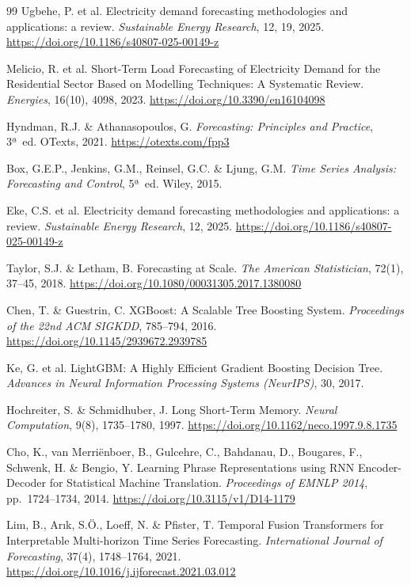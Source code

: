 \documentclass[12pt, a4paper]{article}
\begin{document}
\begin{thebibliography}{99}
Ugbehe, P. et al. Electricity demand forecasting methodologies and applications: a review. \textit{Sustainable Energy Research}, 12, 19, 2025.
\url{https://doi.org/10.1186/s40807-025-00149-z}

Melicio, R. et al. Short-Term Load Forecasting of Electricity Demand for the Residential Sector Based on Modelling Techniques: A Systematic Review. \textit{Energies}, 16(10), 4098, 2023.
\url{https://doi.org/10.3390/en16104098}

Hyndman, R.J. \& Athanasopoulos, G. \textit{Forecasting: Principles and Practice}, 3ª~ed. OTexts, 2021.
\url{https://otexts.com/fpp3}

Box, G.E.P., Jenkins, G.M., Reinsel, G.C. \& Ljung, G.M. \textit{Time Series Analysis: Forecasting and Control}, 5ª~ed. Wiley, 2015.

Eke, C.S. et al. Electricity demand forecasting methodologies and applications: a review. \textit{Sustainable Energy Research}, 12, 2025.
\url{https://doi.org/10.1186/s40807-025-00149-z}

Taylor, S.J. \& Letham, B. Forecasting at Scale. \textit{The American Statistician}, 72(1), 37--45, 2018.
\url{https://doi.org/10.1080/00031305.2017.1380080}

Chen, T. \& Guestrin, C. XGBoost: A Scalable Tree Boosting System. \textit{Proceedings of the 22nd ACM SIGKDD}, 785--794, 2016.
\url{https://doi.org/10.1145/2939672.2939785}

Ke, G. et al. LightGBM: A Highly Efficient Gradient Boosting Decision Tree. \textit{Advances in Neural Information Processing Systems (NeurIPS)}, 30, 2017.

Hochreiter, S. \& Schmidhuber, J. Long Short-Term Memory. \textit{Neural Computation}, 9(8), 1735--1780, 1997.
\url{https://doi.org/10.1162/neco.1997.9.8.1735}

Cho, K., van Merriënboer, B., Gulcehre, C., Bahdanau, D., Bougares, F., Schwenk, H. \& Bengio, Y. Learning Phrase Representations using RNN Encoder-Decoder for Statistical Machine Translation. \textit{Proceedings of EMNLP 2014}, pp.~1724--1734, 2014.
\url{https://doi.org/10.3115/v1/D14-1179}

Lim, B., Arık, S.Ö., Loeff, N. \& Pfister, T. Temporal Fusion Transformers for Interpretable Multi-horizon Time Series Forecasting. \textit{International Journal of Forecasting}, 37(4), 1748--1764, 2021.
\url{https://doi.org/10.1016/j.ijforecast.2021.03.012}


\end{thebibliography}
\end{document}
